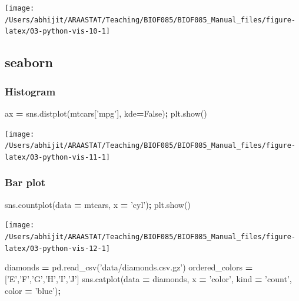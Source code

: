 \documentclass[
  letterpaper,
]{scrbook}
\newenvironment{Shaded}{\begin{snugshade}}{\end{snugshade}}
\newcommand{\NormalTok}[1]{#1}
\newcommand{\OperatorTok}[1]{\textcolor[rgb]{0.81,0.36,0.00}{\textbf{#1}}}
\newcommand{\StringTok}[1]{\textcolor[rgb]{0.31,0.60,0.02}{#1}}
\newcommand{\VariableTok}[1]{\textcolor[rgb]{0.00,0.00,0.00}{#1}}
\begin{document}
\begin{center}\texttt{[image: /Users/abhijit/ARAASTAT/Teaching/BIOF085/BIOF085\_Manual\_files/figure-latex/03-python-vis-10-1]} \end{center}

\hypertarget{seaborn}{%
\subsection{seaborn}\label{seaborn}}

\hypertarget{histogram-1}{%
\subsubsection{Histogram}\label{histogram-1}}

\begin{Shaded}
\begin{Highlighting}[]
\NormalTok{ax }\OperatorTok{=}\NormalTok{ sns.distplot(mtcars[}\StringTok{'mpg'}\NormalTok{], kde}\OperatorTok{=}\VariableTok{False}\NormalTok{)}\OperatorTok{;}
\NormalTok{plt.show()}
\end{Highlighting}
\end{Shaded}

\begin{center}\texttt{[image: /Users/abhijit/ARAASTAT/Teaching/BIOF085/BIOF085\_Manual\_files/figure-latex/03-python-vis-11-1]} \end{center}

\hypertarget{bar-plot-1}{%
\subsubsection{Bar plot}\label{bar-plot-1}}

\begin{Shaded}
\begin{Highlighting}[]
\NormalTok{sns.countplot(data }\OperatorTok{=}\NormalTok{ mtcars, x }\OperatorTok{=} \StringTok{'cyl'}\NormalTok{)}\OperatorTok{;}
\NormalTok{plt.show()}
\end{Highlighting}
\end{Shaded}

\begin{center}\texttt{[image: /Users/abhijit/ARAASTAT/Teaching/BIOF085/BIOF085\_Manual\_files/figure-latex/03-python-vis-12-1]} \end{center}

\begin{Shaded}
\begin{Highlighting}[]
\NormalTok{diamonds }\OperatorTok{=}\NormalTok{ pd.read_csv(}\StringTok{'data/diamonds.csv.gz'}\NormalTok{)}
\NormalTok{ordered_colors }\OperatorTok{=}\NormalTok{ [}\StringTok{'E'}\NormalTok{,}\StringTok{'F'}\NormalTok{,}\StringTok{'G'}\NormalTok{,}\StringTok{'H'}\NormalTok{,}\StringTok{'I'}\NormalTok{,}\StringTok{'J'}\NormalTok{]}
\NormalTok{sns.catplot(data }\OperatorTok{=}\NormalTok{ diamonds, x }\OperatorTok{=} \StringTok{'color'}\NormalTok{, kind }\OperatorTok{=} \StringTok{'count'}\NormalTok{, color }\OperatorTok{=} \StringTok{'blue'}\NormalTok{)}\OperatorTok{;}
\end{Highlighting}
\end{Shaded}
\end{document}

